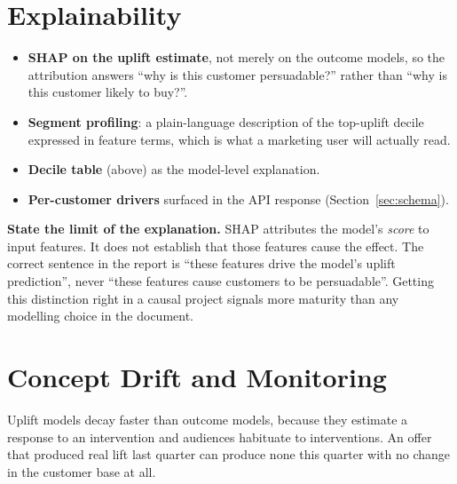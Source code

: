 \documentclass[11pt,a4paper]{article}
\begin{document}
\section{Explainability}

\begin{itemize}
\item \textbf{SHAP on the uplift estimate}, not merely on the outcome models, so the attribution
answers ``why is this customer persuadable?'' rather than ``why is this customer likely to buy?''.
\item \textbf{Segment profiling}: a plain-language description of the top-uplift decile expressed
in feature terms, which is what a marketing user will actually read.
\item \textbf{Decile table} (above) as the model-level explanation.
\item \textbf{Per-customer drivers} surfaced in the API response (Section~\ref{sec:schema}).
\end{itemize}

\begin{alertbox}
\textbf{State the limit of the explanation.} SHAP attributes the model's \emph{score} to input
features. It does not establish that those features cause the effect. The correct sentence in the
report is ``these features drive the model's uplift prediction'', never ``these features cause
customers to be persuadable''. Getting this distinction right in a causal project signals more
maturity than any modelling choice in the document.
\end{alertbox}

\section{Concept Drift and Monitoring}
\label{sec:drift}

Uplift models decay faster than outcome models, because they estimate a response to an intervention
and audiences habituate to interventions. An offer that produced real lift last quarter can produce
none this quarter with no change in the customer base at all.
\end{document}
